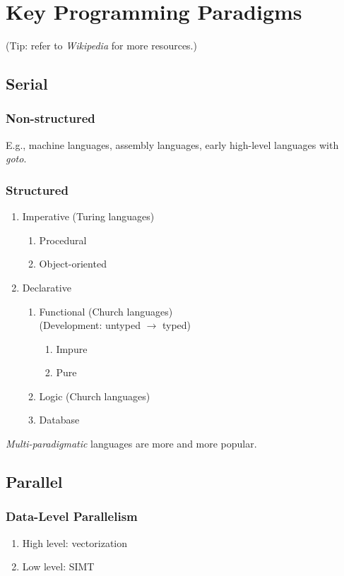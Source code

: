 \documentclass{article}
\begin{document}
\appendix
\section{Key Programming Paradigms}
(Tip: refer to \emph{Wikipedia} for more resources.)
\subsection{Serial}
\subsubsection{Non-structured}
E.g., machine languages, assembly languages, early high-level languages with \emph{goto}.
\subsubsection{Structured}
\begin{enumerate}
    \item Imperative
    (Turing languages)
    \begin{enumerate}
        \item Procedural
        \item Object-oriented
    \end{enumerate}
    \item Declarative
    \begin{enumerate}
        \item Functional
        (Church languages)\\
        (Development: untyped $\rightarrow$ typed)
        \begin{enumerate}
            \item Impure
            \item Pure
        \end{enumerate}
        \item Logic
        (Church languages)
        \item Database
    \end{enumerate}
\end{enumerate}
\emph{Multi-paradigmatic} languages are more and more popular.
\subsection{Parallel}
\subsubsection{Data-Level Parallelism}
\begin{enumerate}
    \item High level: vectorization
    \item Low level: SIMT
\end{enumerate}
\end{document}
